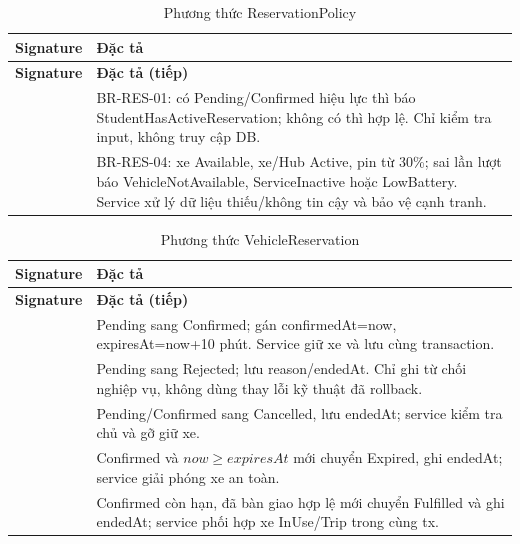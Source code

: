 \begin{longtable}{|L{58mm}|L{81mm}|}
\caption{Phương thức ReservationPolicy}\\\hline
\textbf{Signature} & \textbf{Đặc tả}\\\hline
\endfirsthead
\hline\textbf{Signature} & \textbf{Đặc tả (tiếp)}\\\hline\endhead
{} & BR-RES-01: có Pending/Confirmed hiệu lực thì báo StudentHasActiveReservation; không có thì hợp lệ. Chỉ kiểm tra input, không truy cập DB.\\\hline
{} & BR-RES-04: xe Available, xe/Hub Active, pin từ 30\%; sai lần lượt báo VehicleNotAvailable, ServiceInactive hoặc LowBattery. Service xử lý dữ liệu thiếu/không tin cậy và bảo vệ cạnh tranh.\\\hline
\end{longtable}


\begin{longtable}{|L{58mm}|L{81mm}|}
\caption{Phương thức VehicleReservation}\\\hline
\textbf{Signature} & \textbf{Đặc tả}\\\hline
\endfirsthead
\hline\textbf{Signature} & \textbf{Đặc tả (tiếp)}\\\hline\endhead
{} & Pending sang Confirmed; gán confirmedAt=now, expiresAt=now+10 phút. Service giữ xe và lưu cùng transaction.\\\hline
{} & Pending sang Rejected; lưu reason/endedAt. Chỉ ghi từ chối nghiệp vụ, không dùng thay lỗi kỹ thuật đã rollback.\\\hline
{} & Pending/Confirmed sang Cancelled, lưu endedAt; service kiểm tra chủ và gỡ giữ xe.\\\hline
{} & Confirmed và $now\geq expiresAt$ mới chuyển Expired, ghi endedAt; service giải phóng xe an toàn.\\\hline
{} & Confirmed còn hạn, đã bàn giao hợp lệ mới chuyển Fulfilled và ghi endedAt; service phối hợp xe InUse/Trip trong cùng tx.\\\hline
\end{longtable}
